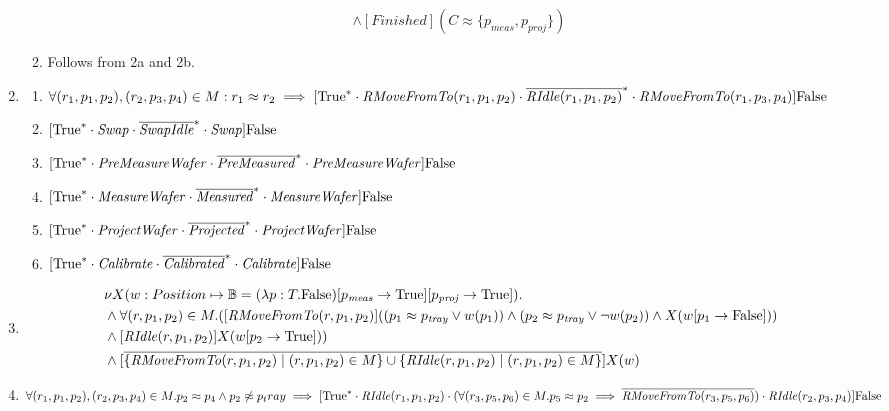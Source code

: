 \begin{enumerate}
\begin{enumerate}
\begin{align*}
            &\wedge [\mathit{Finished}](C \approx \{p_\mathit{meas},p_\mathit{proj}\})
        \end{align*}
        \item Follows from 2a and 2b.
    \end{enumerate}
    \item \begin{enumerate}
        \item $\forall (r_1, p_1, p_2), (r_2, p_3, p_4) \in M : r_1 \approx r_2 \implies [\text{True}^{*} \cdot \mathit{RMoveFromTo}(r_1, p_1, p_2) \cdot \overline{\mathit{RIdle}(r_1, p_1, p_2)}^{*} \cdot \mathit{RMoveFromTo}(r_1, p_3, p_4)]\text{False}$
        \item $[\text{True}^{*} \cdot \mathit{Swap} \cdot \overline{\mathit{SwapIdle}}^{*} \cdot \mathit{Swap}]\text{False}$
        \item $[\text{True}^{*} \cdot \mathit{PreMeasureWafer} \cdot \overline{\mathit{PreMeasured}}^{*} \cdot \mathit{PreMeasureWafer}]\text{False}$
        \item $[\text{True}^{*} \cdot \mathit{MeasureWafer} \cdot \overline{\mathit{Measured}}^{*} \cdot \mathit{MeasureWafer}]\text{False}$
        \item $[\text{True}^{*} \cdot \mathit{ProjectWafer} \cdot \overline{\mathit{Projected}}^{*} \cdot \mathit{ProjectWafer}]\text{False}$
        \item $[\text{True}^{*} \cdot \mathit{Calibrate} \cdot \overline{\mathit{Calibrated}}^{*} \cdot \mathit{Calibrate}]\text{False}$
    \end{enumerate}
    \item \begin{align*}
            &\nu X(w:Position \mapsto \mathbb{B} = (\lambda p:T.\text{False})[p_\mathit{meas} \rightarrow \text{True}][p_\mathit{proj} \rightarrow \text{True}]). \\
            &\wedge \forall (r, p_1, p_2) \in M.([\mathit{RMoveFromTo}(r, p_1,p_2)]((p_1 \approx p_\mathit{tray} \vee w(p_1)) \wedge (p_2 \approx p_\mathit{tray} \vee \lnot w(p_2)) \wedge X(w[p_1\rightarrow \text{False}]))\\
            &\wedge [\mathit{RIdle}(r, p_1,p_2)]X(w[p_2\rightarrow \text{True}]))\\
            &\wedge [\overline{\{\mathit{RMoveFromTo}(r, p_1, p_2) \mid (r, p_1, p_2) \in M\} \cup \{\mathit{RIdle}(r, p_1, p_2) \mid (r, p_1, p_2) \in M\}}]X(w)
        \end{align*}
    \item $\forall (r_1, p_1, p_2), (r_2, p_3, p_4) \in M. p_2 \approx p_4 \wedge p_2 \not\approx p_tray \implies [\text{True}^{*} \cdot \mathit{RIdle}(r_1, p_1, p_2) \cdot (\forall (r_3, p_5, p_6) \in M. p_5 \approx p_2 \implies \overline{\mathit{RMoveFromTo}(r_3, p_5, p_6)}) \cdot \mathit{RIdle}(r_2, p_3, p_4)]\text{False}$

\end{enumerate}
